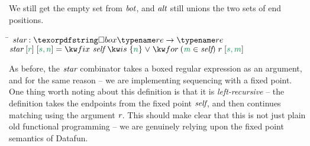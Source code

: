 %
We still get the empty set from $\text{\itshape bot}$, and $\text{\itshape alt}$
still unions the two sets of end positions.
%
\begin{tabbing}
\qquad \=  $\name{star} : \iso\tre \to \tre$\+ \\
  $\name{star}\;\ebox{r}\;\ebox{s, n} = \efixis{\name{self}}{\eset{n} \vee
                                                \efor{m}{\name{self}}{r\;\ebox{s,m}}}$
\end{tabbing}
%
As before, the $\text{\itshape star}$ combinator takes a boxed regular expression as an argument,
and for the same reason -- we are implementing sequencing with a fixed point. One thing
worth noting about this definition is that it is \emph{left-recursive} -- the definition
takes the endpoints from the fixed point $\text{\itshape self}$, and then continues matching using
the argument $\text{\itshape r}$. This should make clear that this is not just plain old functional
programming -- we are genuinely relying upon the fixed point semantics of Datafun.
